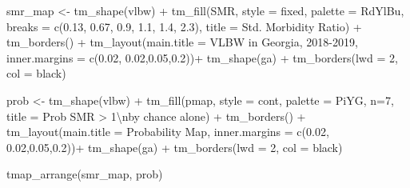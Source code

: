 \documentclass[
]{book}
\newenvironment{Shaded}{\begin{snugshade}}{\end{snugshade}}
\newcommand{\AttributeTok}[1]{\textcolor[rgb]{0.77,0.63,0.00}{#1}}
\newcommand{\DecValTok}[1]{\textcolor[rgb]{0.00,0.00,0.81}{#1}}
\newcommand{\FloatTok}[1]{\textcolor[rgb]{0.00,0.00,0.81}{#1}}
\newcommand{\FunctionTok}[1]{\textcolor[rgb]{0.00,0.00,0.00}{#1}}
\newcommand{\NormalTok}[1]{#1}
\newcommand{\OtherTok}[1]{\textcolor[rgb]{0.56,0.35,0.01}{#1}}
\newcommand{\SpecialCharTok}[1]{\textcolor[rgb]{0.00,0.00,0.00}{#1}}
\newcommand{\StringTok}[1]{\textcolor[rgb]{0.31,0.60,0.02}{#1}}
\begin{document}
\begin{Shaded}
\begin{Highlighting}[]
\NormalTok{smr\_map }\OtherTok{\textless{}{-}} \FunctionTok{tm\_shape}\NormalTok{(vlbw) }\SpecialCharTok{+}
  \FunctionTok{tm\_fill}\NormalTok{(}\StringTok{\textquotesingle{}SMR\textquotesingle{}}\NormalTok{,}
          \AttributeTok{style =} \StringTok{\textquotesingle{}fixed\textquotesingle{}}\NormalTok{, }
          \AttributeTok{palette =} \StringTok{\textquotesingle{}{-}RdYlBu\textquotesingle{}}\NormalTok{,}
          \AttributeTok{breaks =} \FunctionTok{c}\NormalTok{(}\FloatTok{0.13}\NormalTok{, }\FloatTok{0.67}\NormalTok{, }\FloatTok{0.9}\NormalTok{, }\FloatTok{1.1}\NormalTok{, }\FloatTok{1.4}\NormalTok{, }\FloatTok{2.3}\NormalTok{),}
          \AttributeTok{title =} \StringTok{\textquotesingle{}Std. Morbidity Ratio\textquotesingle{}}\NormalTok{) }\SpecialCharTok{+} 
  \FunctionTok{tm\_borders}\NormalTok{() }\SpecialCharTok{+}
  \FunctionTok{tm\_layout}\NormalTok{(}\AttributeTok{main.title =} \StringTok{\textquotesingle{}VLBW in Georgia, 2018{-}2019\textquotesingle{}}\NormalTok{,}
            \AttributeTok{inner.margins =} \FunctionTok{c}\NormalTok{(}\FloatTok{0.02}\NormalTok{, }\FloatTok{0.02}\NormalTok{,}\FloatTok{0.05}\NormalTok{,}\FloatTok{0.2}\NormalTok{))}\SpecialCharTok{+}
  \FunctionTok{tm\_shape}\NormalTok{(ga) }\SpecialCharTok{+}
  \FunctionTok{tm\_borders}\NormalTok{(}\AttributeTok{lwd =} \DecValTok{2}\NormalTok{, }\AttributeTok{col =} \StringTok{\textquotesingle{}black\textquotesingle{}}\NormalTok{)}

\NormalTok{prob }\OtherTok{\textless{}{-}} \FunctionTok{tm\_shape}\NormalTok{(vlbw) }\SpecialCharTok{+} 
  \FunctionTok{tm\_fill}\NormalTok{(}\StringTok{\textquotesingle{}pmap\textquotesingle{}}\NormalTok{,}
          \AttributeTok{style =} \StringTok{\textquotesingle{}cont\textquotesingle{}}\NormalTok{,}
          \AttributeTok{palette =} \StringTok{\textquotesingle{}PiYG\textquotesingle{}}\NormalTok{,}
          \AttributeTok{n=}\DecValTok{7}\NormalTok{,}
          \AttributeTok{title =} \StringTok{\textquotesingle{}Prob SMR \textgreater{} 1}\SpecialCharTok{\textbackslash{}n}\StringTok{by chance alone\textquotesingle{}}\NormalTok{) }\SpecialCharTok{+} 
  \FunctionTok{tm\_borders}\NormalTok{() }\SpecialCharTok{+} 
  \FunctionTok{tm\_layout}\NormalTok{(}\AttributeTok{main.title =} \StringTok{\textquotesingle{}Probability Map\textquotesingle{}}\NormalTok{,}
            \AttributeTok{inner.margins =} \FunctionTok{c}\NormalTok{(}\FloatTok{0.02}\NormalTok{, }\FloatTok{0.02}\NormalTok{,}\FloatTok{0.05}\NormalTok{,}\FloatTok{0.2}\NormalTok{))}\SpecialCharTok{+}
  \FunctionTok{tm\_shape}\NormalTok{(ga) }\SpecialCharTok{+}
  \FunctionTok{tm\_borders}\NormalTok{(}\AttributeTok{lwd =} \DecValTok{2}\NormalTok{, }\AttributeTok{col =} \StringTok{\textquotesingle{}black\textquotesingle{}}\NormalTok{)}

\FunctionTok{tmap\_arrange}\NormalTok{(smr\_map, prob)}
\end{Highlighting}
\end{Shaded}
\end{document}
